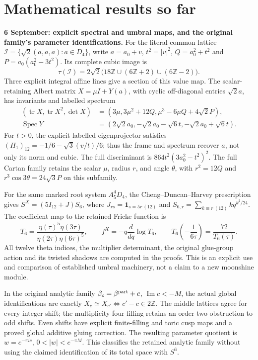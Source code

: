 \section{Mathematical results so far}
\label{sec:mathematical-summary}

\noindent\textbf{6 September: explicit spectral and umbral maps, and the original family's parameter identifications.}
For the literal common lattice $\mathcal I=\{\sqrt2(a,a,a):a\in D_4\}$,
write $a=a_0+v$, $t^2=|v|^2$, $Q=a_0^2+t^2$ and
$P=a_0(a_0^2-3t^2)$. Its complete cubic image is
\[
 \tau(\mathcal I)=2\sqrt2\bigl(18\mathbb Z\cup(6\mathbb Z+2)
                                      \cup(6\mathbb Z-2)\bigr).
\]
Three explicit integral affine lines give a section of this value map.
The scalar-retaining Albert matrix $X=\mu I+Y(a)$, with cyclic
off-diagonal entries $\sqrt2a$, has invariants and labelled spectrum
\[
\begin{aligned}
 (\operatorname{tr}X,\operatorname{tr}X^2,\det X)
   &=(3\mu,3\mu^2+12Q,\mu^3-6\mu Q+4\sqrt2P),\\
 \operatorname{Spec}Y
   &=(2\sqrt2a_0,-\sqrt2a_0-\sqrt6t,-\sqrt2a_0+\sqrt6t).
\end{aligned}
\]
For $t>0$, the explicit labelled eigenprojector satisfies
$(\Pi_1)_{12}=-1/6-\sqrt3(v/t)/6$; thus the frame and spectrum
recover $a$, not only its norm and cubic. The full discriminant is
$864t^2(3a_0^2-t^2)^2$. The full Cartan family retains the scalar
$\mu$, radius $r$, and angle $\theta$, with $r^2=12Q$ and
$r^3\cos3\theta=24\sqrt3P$ on this subfamily.

For the same marked root system $A_5^4D_4$, the
Cheng--Duncan--Harvey prescription gives
$S^X=(5I_{12}+J)S_6$, where $J_{rs}=\mathbf1_{s=5r\ (12)}$ and
$S_{6,r}=\sum_{k\equiv r\ (12)}kq^{k^2/24}$.
The coefficient map to the retained Fricke function is
\[
 T_6=\frac{\eta(\tau)^5\eta(3\tau)}{\eta(2\tau)\eta(6\tau)^5},
 \qquad f^X=-q\frac{d}{dq}\log T_6,
 \qquad T_6\!\left(-\frac1{6\tau}\right)=\frac{72}{T_6(\tau)}.
\]
All twelve theta indices, the multiplier determinant, the original
glue-group action and its twisted shadows are computed in the proofs.
This is an explicit use and comparison of established umbral machinery,
not a claim to a new moonshine module.

In the original analytic family $\beta_c=\beta^{\rm part}+c$,
$\operatorname{Im}c<-M$, the actual global identifications are exactly
$X_c\simeq X_{c'}\Longleftrightarrow c'-c\in2\mathbb Z$.
The middle lattices agree for every integer shift; the multiplicity-four
filling retains an order-two obstruction to odd shifts. Even shifts have
explicit finite-filling and toric cusp maps and a proved global additive
gluing correction. The resulting parameter quotient is
$w=e^{-\pi ic}$, $0<|w|<e^{-\pi M}$.
This classifies the retained analytic family without using the claimed
identification of its total space with $S^6$.


